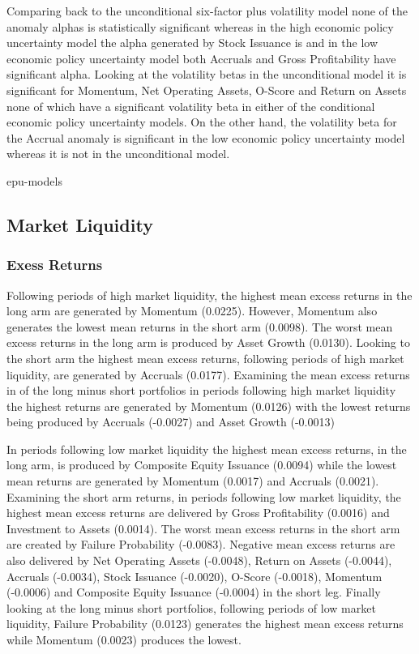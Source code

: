 \documentclass[12pt, a4paper, oneside]{article}
\begin{document}
Comparing back to the unconditional six-factor plus volatility model none of the anomaly alphas is statistically significant whereas in the high economic policy uncertainty model the alpha generated by Stock Issuance is and in the low economic policy uncertainty model both Accruals and Gross Profitability have significant alpha. Looking at the volatility betas in the unconditional model it is significant for Momentum, Net Operating Assets, O-Score and Return on Assets none of which have a significant volatility beta in either of the conditional economic policy uncertainty models. On the other hand, the volatility beta for the Accrual anomaly is significant in the low economic policy uncertainty model whereas it is not in the unconditional model.

{epu-models}

\subsection{Market Liquidity}
\subsubsection{Exess Returns}
Following periods of high market liquidity, the highest mean excess returns in the long arm are generated by Momentum (0.0225). However, Momentum also generates the lowest mean returns in the short arm (0.0098). The worst mean excess returns in the long arm is produced by Asset Growth (0.0130). Looking to the short arm the highest mean excess returns, following periods of high market liquidity, are generated by Accruals (0.0177). Examining the mean excess returns in of the long minus short portfolios in periods following high market liquidity the highest returns are generated by Momentum (0.0126) with the lowest returns being produced by Accruals (-0.0027) and Asset Growth (-0.0013)

In periods following low market liquidity the highest mean excess returns, in the long arm, is produced by Composite Equity Issuance (0.0094) while the lowest mean returns are generated by Momentum (0.0017) and Accruals (0.0021). Examining the short arm returns, in periods following low market liquidity, the highest mean excess returns are delivered by Gross Profitability (0.0016) and Investment to Assets (0.0014). The worst mean excess returns in the short arm are created by Failure Probability (-0.0083). Negative mean excess returns are also delivered by Net Operating Assets (-0.0048), Return on Assets (-0.0044), Accruals (-0.0034), Stock Issuance (-0.0020), O-Score (-0.0018), Momentum (-0.0006) and Composite Equity Issuance (-0.0004) in the short leg. Finally looking at the long minus short portfolios, following periods of low market liquidity, Failure Probability (0.0123) generates the highest mean excess returns while Momentum (0.0023) produces the lowest.
\end{document}
